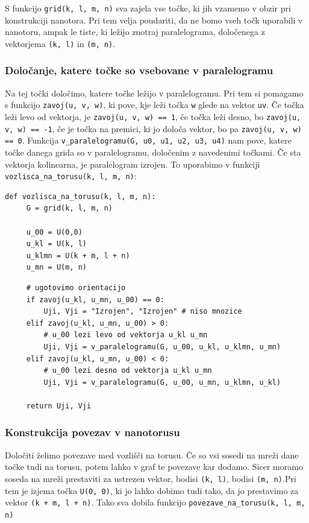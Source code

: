 \documentclass[a4paper, 11 pt]{article}
\begin{document}
S funkcijo \texttt{grid(k, l, m, n)} sva zajela vse točke, ki jih vzamemo v obzir pri konstrukciji nanotora. Pri tem velja poudariti, da ne bomo vseh točk uporabili v nanotoru, ampak le tiste, ki ležijo znotraj paralelograma, določenega z vektorjema \texttt{(k, l)} in \texttt{(m, n)}. 


\subsubsection{Določanje, katere točke so vsebovane v paralelogramu}

Na tej točki določimo, katere točke ležijo v paralelogramu. Pri tem si pomagamo s funkcijo \texttt{zavoj(u, v, w)}, ki pove, kje leži točka \texttt{w} glede na vektor \texttt{uv}. Če točka leži levo od vektorja, je \texttt{zavoj(u, v, w) == 1}, če točka leži desno, bo \texttt{zavoj(u, v, w) == -1}, če je točka na premici, ki jo določa vektor, bo pa \texttt{zavoj(u, v, w) == 0}. Funkcija \texttt{v\_paralelogramu(G, u0, u1, u2, u3, u4)} nam pove, katere točke danega grida so v paralelogramu, določenim z navedenimi točkami. Če sta vektorja kolinearna, je paralelogram izrojen. To uporabimo v funkciji \texttt{vozlisca\_na\_torusu(k, l, m, n)}:

\begin{verbatim}
def vozlisca_na_torusu(k, l, m, n):
     G = grid(k, l, m, n)
    
     u_00 = U(0,0)
     u_kl = U(k, l)
     u_klmn = U(k + m, l + n)
     u_mn = U(m, n)
\end{verbatim}
        
\pagebreak

\begin{verbatim}
     # ugotovimo orientacijo
     if zavoj(u_kl, u_mn, u_00) == 0:
         Uji, Vji = "Izrojen", "Izrojen" # niso mnozice
     elif zavoj(u_kl, u_mn, u_00) > 0:
         # u_00 lezi levo od vektorja u_kl u_mn
         Uji, Vji = v_paralelogramu(G, u_00, u_kl, u_klmn, u_mn)
     elif zavoj(u_kl, u_mn, u_00) < 0:
         # u_00 lezi desno od vektorja u_kl u_mn
         Uji, Vji = v_paralelogramu(G, u_00, u_mn, u_klmn, u_kl)
    
     return Uji, Vji
\end{verbatim}

\subsubsection{Konstrukcija povezav v nanotorusu}

Določiti želimo povezave med vozlišči na torusu. Če so vsi sosedi na mreži dane točke tudi na torusu, potem lahko v graf te povezave kar dodamo. Sicer moramo soseda na mreži prestaviti za ustrezen vektor, bodisi \texttt{(k, l)}, bodisi \texttt{(m, n)}.Pri tem je izjema točka \texttt{U(0, 0)}, ki jo lahko dobimo tudi tako, da jo prestavimo za vektor \texttt{(k + m, l + n)}.  Tako sva dobila funkcijo \texttt{povezave\_na\_torusu(k, l, m, n)}
\end{document}
